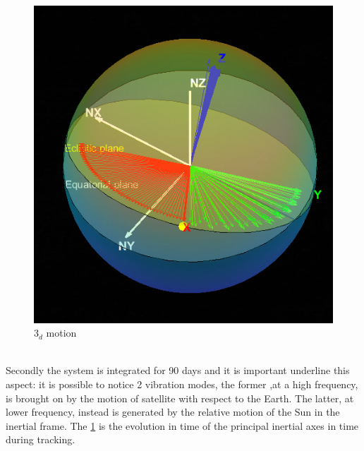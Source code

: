 \documentclass[11pt]{article}
\begin{document}
\begin{minipage}{.5 \textwidth}
\begin{figure} [H]
\centering 
\includegraphics[scale=0.65]{SPHERE_POINTING.PNG}
\caption{ $3_d$ motion}
\label{qwertyuio}
\end{figure}
\end{minipage}\\

Secondly the system  is integrated  for 90 days and it is important underline this aspect: it is possible to notice 2 vibration modes, the former ,at a high frequency,  is brought on by the motion of satellite with respect to the Earth. The latter, at lower frequency, instead is generated by the relative motion of the Sun in the inertial frame.
The \ref{qwertyuio} is the evolution in time of the principal inertial axes in time during tracking.
\end{document}
